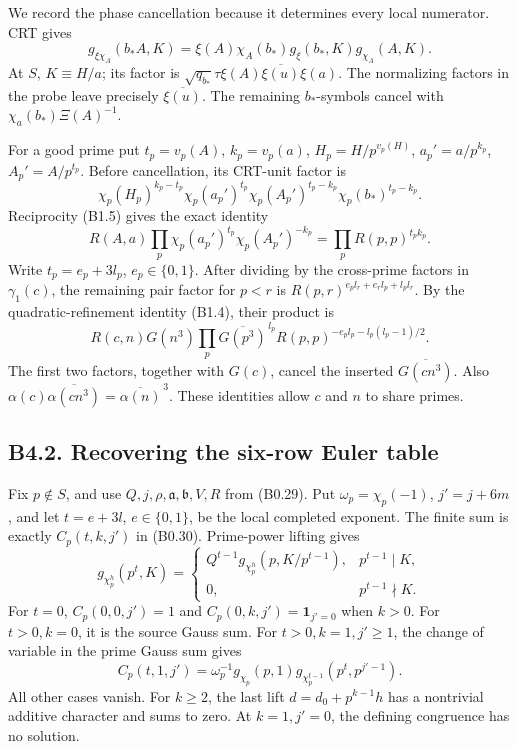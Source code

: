 \documentclass[11pt,a4paper]{article}
\begin{document}
We record the phase cancellation because it determines every local
numerator. CRT gives \[
g_{\xi\chi_A}(b_*A,K)=\xi(A)\chi_A(b_*)g_\xi(b_*,K)g_{\chi_A}(A,K).
\] At \(S\), \(K\equiv H/a\); its factor is
\(\sqrt{q_{b_*}}\tau\xi(A)\overline{\xi(u)}\xi(a)\). The normalizing
factors in the probe leave precisely \(\overline{\xi(u)}\). The
remaining \(b_*\)-symbols cancel with \(\chi_a(b_*)\Xi(A)^{-1}\).

For a good prime put \(t_p=v_p(A)\), \(k_p=v_p(a)\),
\(H_p=H/p^{v_p(H)}\), \(a_p'=a/p^{k_p}\), \(A_p'=A/p^{t_p}\). Before
cancellation, its CRT-unit factor is \[
\chi_p(H_p)^{k_p-t_p}\chi_p(a_p')^{t_p}\chi_p(A_p')^{t_p-k_p}\chi_p(b_*)^{t_p-k_p}.
\] Reciprocity (B1.5) gives the exact identity \[
R(A,a)\prod_p\chi_p(a_p')^{t_p}\chi_p(A_p')^{-k_p}
=\prod_pR(p,p)^{t_pk_p}.
\tag{B4.4}
\] Write \(t_p=e_p+3l_p\), \(e_p\in\{0,\allowbreak{}1\}\). After dividing by the
cross-prime factors in \(\gamma_1(c)\), the remaining pair factor for
\(p<r\) is \(R(p,\allowbreak{}r)^{e_pl_r+e_rl_p+l_pl_r}\). By the
quadratic-refinement identity (B1.4), their product is \[
R(c,n)G(n^3)\prod_p\overline{G(p^3)}^{\,l_p}
R(p,p)^{-e_pl_p-l_p(l_p-1)/2}.
\tag{B4.5}
\] The first two factors, together with \(G(c)\), cancel the inserted
\(\overline{G(cn^3)}\). Also
\(\alpha(c)\overline{\alpha(cn^3)}=\overline{\alpha(n)}^{\,\allowbreak{}3}\). These
identities allow \(c\) and \(n\) to share primes.

\hypertarget{b4.2.-recovering-the-six-row-euler-table}{%
\subsection{B4.2. Recovering the six-row Euler
table}\label{b4.2.-recovering-the-six-row-euler-table}}

Fix \(p\notin S\), and use \(Q,\allowbreak{}j,\allowbreak{}\rho,\allowbreak{}\mathfrak a,\allowbreak{}\mathfrak b,\allowbreak{}V,\allowbreak{}R\) from
(B0.29). Put \(\omega_p=\chi_p(-1)\), \(j'=j+6m\), and let \(t=e+3l\),
\(e\in\{0,\allowbreak{}1\}\), be the local completed exponent. The finite sum is
exactly \(C_p(t,\allowbreak{}k,\allowbreak{}j')\) in (B0.30). Prime-power lifting gives \[
g_{\chi_p^h}(p^t,K)=
\begin{cases}
Q^{t-1}g_{\chi_p^h}(p,K/p^{t-1}),&p^{t-1}\mid K,\\
0,&p^{t-1}\nmid K.
\end{cases}
\tag{B4.6}
\] For \(t=0\), \(C_p(0,\allowbreak{}0,\allowbreak{}j')=1\) and \(C_p(0,\allowbreak{}k,\allowbreak{}j')=\mathbf1_{j'=0}\)
when \(k>0\). For \(t>0,\allowbreak{}k=0\), it is the source Gauss sum. For
\(t>0,\allowbreak{}k=1,\allowbreak{}j'\ge1\), the change of variable in the prime Gauss sum gives
\[
C_p(t,1,j')=\omega_p^{-1}g_{\chi_p}(p,1)
g_{\chi_p^{t-1}}(p^t,p^{j'-1}).
\tag{B4.7}
\] All other cases vanish. For \(k\ge2\), the last lift
\(d=d_0+p^{k-1}h\) has a nontrivial additive character and sums to zero.
At \(k=1,\allowbreak{}j'=0\), the defining congruence has no solution.
\end{document}
